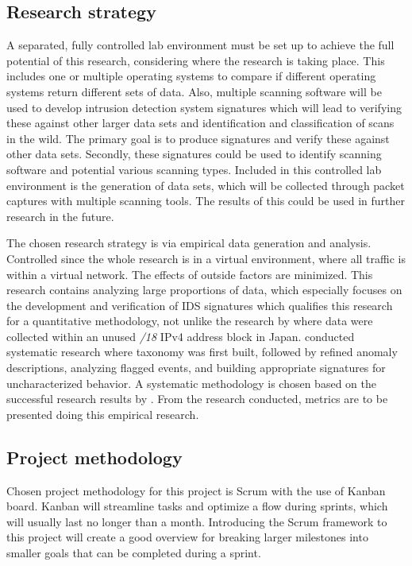 \subsection{Research strategy}
\label{ss:ResearchStrategy}
A separated, fully controlled lab environment must be set up to achieve the full potential of this research, considering where the research is taking place.
This includes one or multiple operating systems to compare if different operating systems return different sets of data. Also, multiple scanning software will be used to develop intrusion detection system signatures which will lead to verifying these against other larger data sets and identification and classification of scans in the wild. The primary goal is to produce signatures and verify these against other data sets. Secondly, these signatures could be used to identify scanning software and potential various scanning types.
Included in this controlled lab environment is the generation of data sets, which will be collected through packet captures with multiple scanning tools. The results of this could be used in further research in the future.

The chosen research strategy is via empirical data generation and analysis.
Controlled since the whole research is in a virtual environment, where all traffic is within a virtual network. The effects of outside factors are minimized.
This research contains analyzing large proportions of data, which especially focuses on the development and verification of IDS signatures which qualifies this research for a quantitative methodology, not unlike the research by \textcite{Liu2018} where data were collected within an unused \textit{/18} IPv4 address block in Japan.
\textcite{6906328} conducted systematic research where taxonomy was first built, followed by refined anomaly descriptions, analyzing flagged events, and building appropriate signatures for uncharacterized behavior.
A systematic methodology is chosen based on the successful research results by \textcite{6906328}. 
From the research conducted, metrics are to be presented doing this empirical research.


\subsection{Project methodology}
\label{ss:ProjectMethodology}
Chosen project methodology for this project is Scrum with the use of Kanban board.
Kanban will streamline tasks and optimize a flow during sprints, which will usually last no longer than a month.
Introducing the Scrum framework to this project will create a good overview for breaking larger milestones into smaller goals that can be completed during a sprint.



